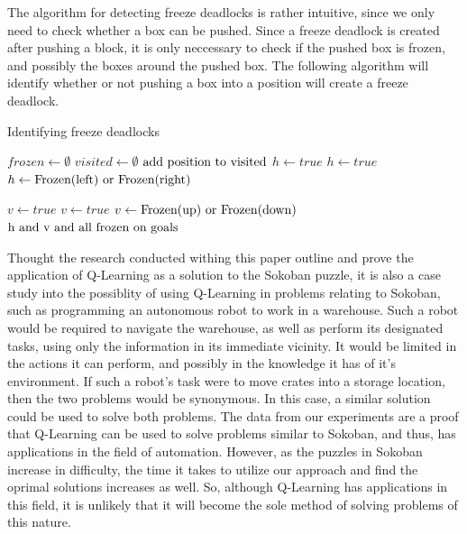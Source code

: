 \documentclass[times, 10pt,twocolumn]{article}
\begin{document}
The algorithm for detecting freeze deadlocks is rather intuitive, since we only need to check whether a box can be pushed. Since a freeze deadlock is created after pushing a block, it is only neccessary to check if the pushed box is frozen, and possibly the boxes around the pushed box. The following algorithm will identify whether or not pushing a box into a position will create a freeze deadlock. \cite{Wiki}

\begin{algorithm}
  \caption{Identifying freeze deadlocks}
\begin{algorithmic}[1]
  \State $frozen \gets \emptyset$
  \State $visited \gets \emptyset$
    \State $\textnormal{add position to visited}$
      \State $h\gets true$
      \State $h\gets true$
      \State $h\gets \textnormal{Frozen(left) or Frozen(right)}$
    \EndIf

      \State $v\gets true$
      \State $v\gets true$
      \State $v\gets \textnormal{Frozen(up) or Frozen(down)}$
    \EndIf
    \State \Return $\textnormal{h and v and all frozen on goals}$
  \EndFunction
  \end{algorithmic}
\end{algorithm}



Thought the research conducted withing this paper outline and prove the application of Q-Learning as a solution to the Sokoban puzzle, it is also a case study into the possiblity of using Q-Learning in problems relating to Sokoban, such as programming an autonomous robot to work in a warehouse. Such a robot would be required to navigate the warehouse, as well as perform its designated tasks, using only the information in its immediate vicinity.  It would be limited in the actions it can perform, and possibly in the knowledge it has of it's environment. If such a robot’s task were to move crates into a storage location, then the two problems would be synonymous. In this case, a similar solution could be used to solve both problems. The data from our experiments are a proof that Q-Learning can be used to solve problems similar to Sokoban, and thus, has applications in the field of automation.  However, as the puzzles in Sokoban increase in difficulty, the time it takes to utilize our approach and find the oprimal solutions increases as well.  So, although Q-Learning has applications in this field, it is unlikely that it will become the sole method of solving problems of this nature.
\end{document}
